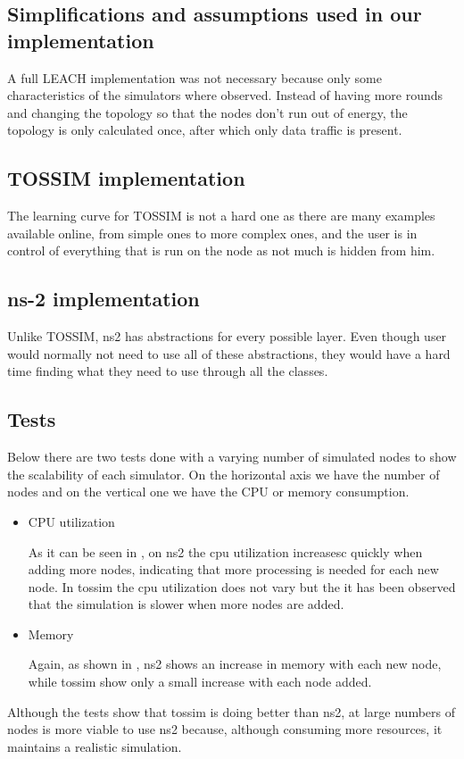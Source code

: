  

\subsection{Simplifications and assumptions used in our implementation}
A full LEACH implementation was not necessary because only some characteristics of
the simulators where observed. Instead of having more rounds and changing the topology
so that the nodes don't run out of energy, the topology is only calculated once, after
which only data traffic is present.
\subsection{TOSSIM implementation}
The learning curve for TOSSIM is not a hard one as there are many examples
available online, from simple ones to more complex ones, and the user is in control of 
everything that is run on the node as not much is hidden from him.

\subsection{ns-2 implementation}
Unlike TOSSIM, ns2 has abstractions for every possible layer. Even though user would normally not
need to use all of these abstractions, they would have a hard time finding what they need
to use through all the classes.

\subsection{Tests}
Below there are two tests done with a varying number of simulated nodes to show the scalability of each simulator.
On the horizontal axis we have the number of nodes and on the vertical one we have the CPU or memory consumption.
\begin{itemize}
    \item{CPU utilization} 
	
    As it can be seen in , on ns2 the cpu utilization increasesc quickly when adding more nodes, indicating that
	more processing is needed for each new node. In tossim the cpu utilization does not vary
	but the it has been observed that the simulation is slower when more nodes are added.
    \item{Memory}
	
    Again, as shown in , ns2 shows an increase in memory with each new node, while tossim show only a small
	increase with each node added.
\end{itemize}

Although the tests show that tossim is doing better than ns2, at large numbers of nodes is more viable
to use ns2 because, although consuming more resources, it maintains a realistic simulation.

